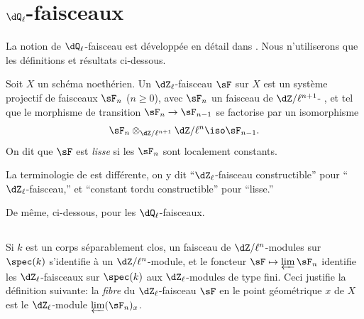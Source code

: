 \section{\texorpdfstring{$\dQ_\ell$}{Ql}-faisceaux}\label{II:2}

La notion de $\dQ_\ell$-faisceau est développée en détail dans 
\cite[V,VI]{sga5}. Nous n'utiliserons que les définitions et résultats 
ci-dessous. 





\begin{definition_}\label{II:2-1}
Soit $X$ un schéma noethérien. Un $\dZ_\ell$-faisceau $\sF$ sur $X$ est un 
système projectif de faisceaux $\sF_n$ ($n\geqslant 0$), avec $\sF_n$ un 
faisceau de $\dZ/\ell^{n+1}$- \cite[IX.2]{sga4}, et tel que 
le morphisme de transition $\sF_n\to\sF_{n-1}$ se factorise par un isomorphisme 
\[
  \sF_n\otimes_{\dZ/\ell^{n+1}} \dZ/\ell^n \iso \sF_{n-1}\text{.}
\]
On dit que $\sF$ est \emph{lisse} si les $\sF_n$ sont localement constants. 
\end{definition_}

La terminologie de \cite{sga5} est différente, on y dit ``$\dZ_\ell$-faisceau 
constructible'' pour ``$\dZ_\ell$-faisceau,'' et ``constant tordu 
constructible'' pour ``lisse.'' 

De même, ci-dessous, pour les $\dQ_\ell$-faisceaux. 





\subsection{}\label{II:2-2}

Si $k$ est un corps séparablement clos, un faisceau de $\dZ/\ell^n$-modules 
sur $\spec(k)$ s'identifie à un $\dZ/\ell^n$-module, et le foncteur 
$\sF\mapsto \varprojlim \sF_n$ identifie les $\dZ_\ell$-faisceaux sur 
$\spec(k)$ aux $\dZ_\ell$-modules de type fini. Ceci justifie la définition 
suivante: la \emph{fibre} du $\dZ_\ell$-faisceau $\sF$ en le point 
géométrique $x$ de $X$ est le $\dZ_\ell$-module $\varprojlim (\sF_n)_x$. 





\subsection{}\label{II:2-3}

